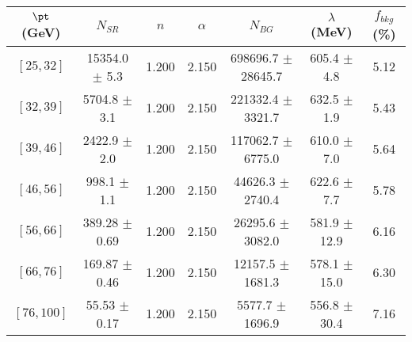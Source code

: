 \begin{tabular}{c||c|c|c|c|c||c}
$\pt$ (GeV) & $N_{SR}$ & $n$ & $\alpha$ & $N_{BG}$  & $\lambda$ (MeV) & $f_{bkg}$ (\%) \\
\hline
$[25, 32]$ & 15354.0 $\pm$ 5.3 & 1.200 & 2.150 & 698696.7 $\pm$ 28645.7 & 605.4 $\pm$ 4.8 & 5.12\\
$[32, 39]$ & 5704.8 $\pm$ 3.1 & 1.200 & 2.150 & 221332.4 $\pm$ 3321.7 & 632.5 $\pm$ 1.9 & 5.43\\
$[39, 46]$ & 2422.9 $\pm$ 2.0 & 1.200 & 2.150 & 117062.7 $\pm$ 6775.0 & 610.0 $\pm$ 7.0 & 5.64\\
$[46, 56]$ & 998.1 $\pm$ 1.1 & 1.200 & 2.150 & 44626.3 $\pm$ 2740.4 & 622.6 $\pm$ 7.7 & 5.78\\
$[56, 66]$ & 389.28 $\pm$ 0.69 & 1.200 & 2.150 & 26295.6 $\pm$ 3082.0 & 581.9 $\pm$ 12.9 & 6.16\\
$[66, 76]$ & 169.87 $\pm$ 0.46 & 1.200 & 2.150 & 12157.5 $\pm$ 1681.3 & 578.1 $\pm$ 15.0 & 6.30\\
$[76, 100]$ & 55.53 $\pm$ 0.17 & 1.200 & 2.150 & 5577.7 $\pm$ 1696.9 & 556.8 $\pm$ 30.4 & 7.16\\
\end{tabular}
